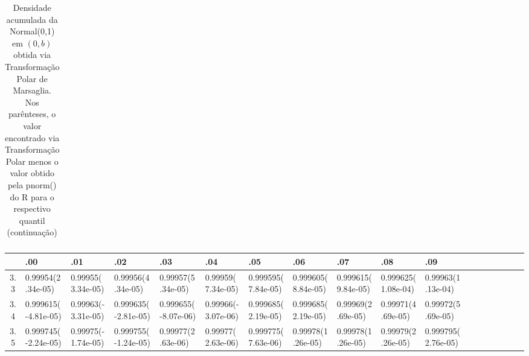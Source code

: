\documentclass[
	article,			%
	12pt,				%
	twoside,			%
	a4paper,			%
	english,			%
	brazil,				%
	]{abntex2}
\begin{document}
\begin{landscape}
\begin{table}
\begin{tabular}{c||p{18mm}|p{18mm}|p{18mm}|p{18mm}|p{18mm}|p{18mm}|p{18mm}|p{18mm}|p{18mm}|p{18mm}|p{18mm}|p{18mm}|p{18mm}|p{18mm}|p{18mm}|p{18mm}|p{18mm}}
\end{tabular}
\caption{Densidade acumulada da Normal(0,1) em $(0,b)$ obtida via Transformação Polar de Marsaglia. Nos parênteses, o valor encontrado via Transformação Polar menos o valor obtido pela pnorm() do R para o respectivo quantil (continuação)}
\end{table}

\begin{table}\footnotesize
	\begin{tabular}{c||p{18mm}|p{18mm}|p{18mm}|p{18mm}|p{18mm}|p{18mm}|p{18mm}|p{18mm}|p{18mm}|p{18mm}|p{18mm}|p{18mm}|p{18mm}|p{18mm}|p{18mm}|p{18mm}|p{18mm}}
	    			~   & .00 & .01 & .02 & .03 & .04 & .05 & .06 & .07 & .08 & .09\\
    			\hline \hline
  				3.3 &0.99954\newline(2.34e-05)&0.99955\newline(3.34e-05)&0.99956\newline(4.34e-05)&0.99957\newline(5.34e-05)&0.99959\newline(7.34e-05)&0.999595\newline(7.84e-05)&0.999605\newline(8.84e-05)&0.999615\newline(9.84e-05)&0.999625\newline(1.08e-04)&0.99963\newline(1.13e-04)\\\hline
    			3.4 &0.999615\newline(-4.81e-05)&0.99963\newline(-3.31e-05)&0.999635\newline(-2.81e-05)&0.999655\newline(-8.07e-06)&0.99966\newline(-3.07e-06)&0.999685\newline(2.19e-05)&0.999685\newline(2.19e-05)&0.99969\newline(2.69e-05)&0.99971\newline(4.69e-05)&0.99972\newline(5.69e-05)\\\hline
    			3.5 &0.999745\newline(-2.24e-05)&0.99975\newline(-1.74e-05)&0.999755\newline(-1.24e-05)&0.99977\newline(2.63e-06)&0.99977\newline(2.63e-06)&0.999775\newline(7.63e-06)&0.99978\newline(1.26e-05)&0.99978\newline(1.26e-05)&0.99979\newline(2.26e-05)&0.999795\newline(2.76e-05)\\\hline

\end{tabular}
\end{table}
\end{landscape}
\end{document}
